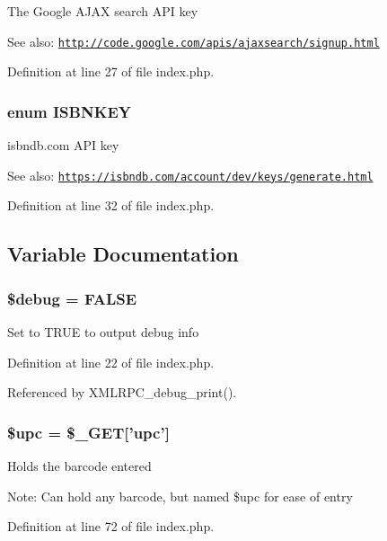 The Google AJAX search API key \begin{Desc}
\item[See also:]\href{http://code.google.com/apis/ajaxsearch/signup.html}{\tt http://code.google.com/apis/ajaxsearch/signup.html} \end{Desc}


Definition at line 27 of file index.php.\hypertarget{index_8php_93bb4a6cf53ca9db8d391bc20eee6442}{
\subsubsection{\setlength{\rightskip}{0pt plus 5cm}enum {\bf ISBNKEY}}}
\label{index_8php_93bb4a6cf53ca9db8d391bc20eee6442}


isbndb.com API key \begin{Desc}
\item[See also:]\href{https://isbndb.com/account/dev/keys/generate.html}{\tt https://isbndb.com/account/dev/keys/generate.html} \end{Desc}


Definition at line 32 of file index.php.

\subsection{Variable Documentation}
\hypertarget{index_8php_85ae3e64cd40e9564adceb010085e9dd}{
\subsubsection{\setlength{\rightskip}{0pt plus 5cm}\$debug = FALSE}}
\label{index_8php_85ae3e64cd40e9564adceb010085e9dd}


Set to TRUE to output debug info 

Definition at line 22 of file index.php.

Referenced by XMLRPC\_\-debug\_\-print().\hypertarget{index_8php_a9aa17ff51d69075d75cfc5bc4e89b34}{
\subsubsection{\setlength{\rightskip}{0pt plus 5cm}\$upc = \$\_\-GET\mbox{[}'upc'\mbox{]}}}
\label{index_8php_a9aa17ff51d69075d75cfc5bc4e89b34}


Holds the barcode entered \begin{Desc}
\item[Note:]Can hold any barcode, but named \$upc for ease of entry \end{Desc}


Definition at line 72 of file index.php.